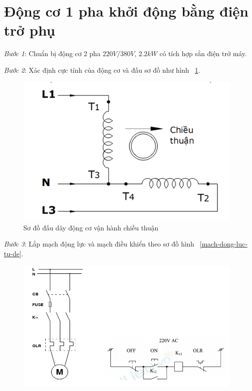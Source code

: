 \documentclass[13pt,a4paper]{extarticle}
\begin{document}
\section{Động cơ 1 pha khởi động bằng điện trở phụ}
\begin{list}{--}{}
\item \textit{Bước 1}: Chuẩn bị động cơ 2 pha $220V/380V$, $2.2kW$ có tích hợp sẳn điện trở máy.
\item \textit{Bước 2}: Xác định cực tính của động cơ và đấu sơ đồ như hình ~\ref{R-phu-thuan}.
\begin{figure}[!h]
\begin{center}
\includegraphics[scale=.6]{R-phu-thuan}
\end{center}
\caption{Sơ đồ đấu dây động cơ vận hành chiều thuận}\label{R-phu-thuan}
\end{figure}
\item \textit{Bước 3}: Lắp mạch động lực và mạch điều khiển theo sơ đồ hình ~\ref{mach-dong-luc-tu-de}.
\begin{figure}[!h]
\begin{center}
\includegraphics[scale=.6]{mach-dluc-dkhien}

\end{center}
\end{figure}
\end{list}
\end{document}
